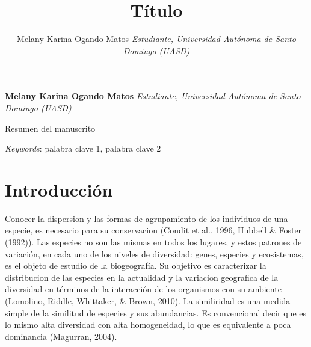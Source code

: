 \documentclass[11pt,]{article}
\title{Título\\[2\baselineskip]  }
\author{\Large Melany Karina Ogando Matos\vspace{0.05in} \newline\normalsize\emph{Estudiante, Universidad Autónoma de Santo Domingo (UASD)}  }
\date{}
\newcommand*{\authorfont}{\fontfamily{phv}\selectfont}
\renewenvironment{abstract}
 {{%
    \setlength{\leftmargin}{0mm}
    \setlength{\rightmargin}{\leftmargin}%
  }%
  \relax}
 {\endlist}
\begin{document}
	
%

{%
\setlength{\parindent}{0pt}
\thispagestyle{plain}
{\fontsize{18}{20}\selectfont\raggedright 
\maketitle  %

}

{
   \vskip 13.5pt\relax \normalsize\fontsize{11}{12} 
\textbf{\authorfont Melany Karina Ogando Matos} \hskip 15pt \emph{\small Estudiante, Universidad Autónoma de Santo Domingo (UASD)}   

}

}








\begin{abstract}

    \hbox{\vrule height .2pt width 39.14pc}

    \vskip 8.5pt %

\noindent Resumen del manuscrito


\vskip 8.5pt \noindent \emph{Keywords}: palabra clave 1, palabra clave 2 \par

    \hbox{\vrule height .2pt width 39.14pc}



\end{abstract}


\vskip 6.5pt


\noindent  \section{Introducción}\label{introducciuxf3n}

Conocer la dispersion y las formas de agrupamiento de los individuos de
una especie, es necesario para su conservacion (Condit et al., 1996,
Hubbell \& Foster (1992)). Las especies no son las mismas en todos los
lugares, y estos patrones de variación, en cada uno de los niveles de
diversidad: genes, especies y ecosistemas, es el objeto de estudio de la
biogeografía. Su objetivo es caracterizar la distribucion de las
especies en la actualidad y la variacion geografica de la diversidad en
términos de la interacción de los organismos con su ambiente (Lomolino,
Riddle, Whittaker, \& Brown, 2010). La similiridad es una medida simple
de la similitud de especies y sus abundancias. Es convencional decir que
es lo mismo alta diversidad con alta homogeneidad, lo que es equivalente
a poca dominancia (Magurran, 2004).
\end{document}
